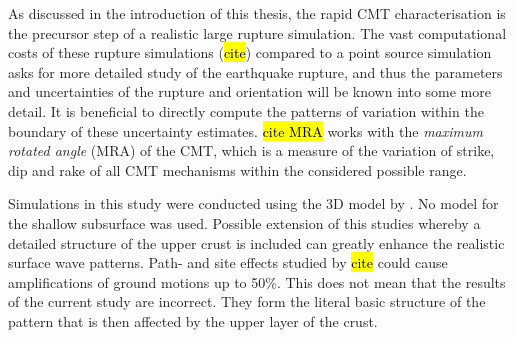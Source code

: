 \documentclass[../00main.tex]{subfiles}
\begin{document}
As discussed in the introduction of this thesis, the rapid CMT characterisation is the precursor step of a realistic large rupture simulation. The vast computational costs of these rupture simulations (\hl{cite}) compared to a point source simulation asks for more detailed study of the earthquake rupture, and thus the parameters and uncertainties of the rupture and orientation will be known into some more detail. It is beneficial to directly compute the patterns of variation within the boundary of these uncertainty estimates. \hl{cite MRA} works with the \textit{maximum rotated angle} (MRA) of the CMT, which is a measure of the variation of strike, dip and rake of all CMT mechanisms within the considered possible range.  

Simulations in this study were conducted using the 3D model by \citep{cubuk-sabuncu_3-d_2017}. No model for the shallow subsurface was used. Possible extension of this studies whereby a detailed structure of the upper crust is included can greatly enhance the realistic surface wave patterns. Path- and site effects studied by \hl{cite} could cause amplifications of ground motions up to 50\%. This does not mean that the results of the current study are incorrect. They form the literal basic structure of the pattern that is then affected by the upper layer of the crust. 







\end{document}
